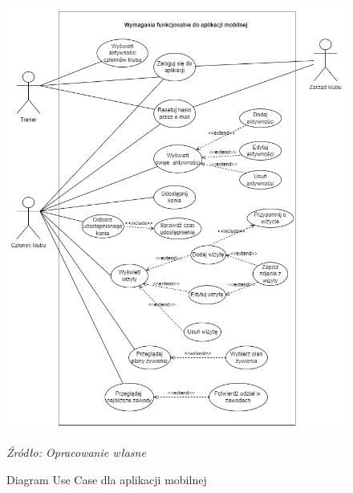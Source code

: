 \documentclass[12pt,oneside]{report}
\begin{document}
\begin{figure}[H]
	\centering
	\includegraphics[scale=0.6]{UseCaseMobile}
	\caption{Diagram Use Case dla aplikacji mobilnej}
	\textit{Źródło: Opracowanie własne}
	\label{UseCaseMobile}
\end{figure}
\newpage
\end{document}
